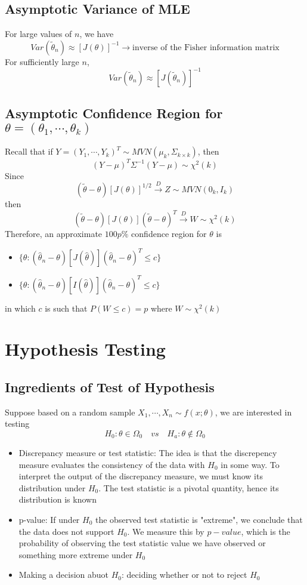 \documentclass[11pt]{article}
\begin{document}
\subsection{Asymptotic Variance of MLE}
For large values of $n$, we have 
\[Var(\tilde{\theta}_n)\approx[J(\theta)]^{-1}\rightarrow\text{inverse of the Fisher information matrix}\]
For sufficiently large $n$, 
\[Var(\tilde{\theta}_n)\approx[J(\tilde{\theta}_n)]^{-1}\]
\subsection{Asymptotic Confidence Region for $\theta=(\theta_1,\cdots,\theta_k)$}
Recall that if $Y=(Y_1,\cdots,Y_k)^T\sim MVN(\mu_k,\Sigma_{k\times k})$, then 
\[(Y-\mu)^T\Sigma^{-1}(Y-\mu)\sim\chi^2(k)\]
Since 
\[(\tilde{\theta}-\theta)\left[J(\theta)\right]^{1/2}\overset{D}{\rightarrow}Z\sim MVN(0_k,I_k)\]
then
\[(\tilde{\theta}-\theta)[J(\theta)](\tilde{\theta}-\theta)^T\overset{D}{\rightarrow}W\sim\chi^2(k)\]
Therefore, an approximate $100p\%$ confidence region for $\theta$ is 
\begin{itemize}
    \item $\{\theta: (\hat\theta_n-\theta)[J(\hat\theta)](\hat\theta_n-\theta)^T\leq c\}$
    \item $\{\theta: (\hat\theta_n-\theta)[I(\hat\theta)](\hat\theta_n-\theta)^T\leq c\}$
\end{itemize}
in which $c$ is such that $P(W\leq c)=p$ where $W\sim\chi^2(k)$

\section{Hypothesis Testing}
\subsection{Ingredients of Test of Hypothesis}
Suppose based on a random sample $X_1,\cdots,X_n\sim f(x;\theta)$, we are interested in testing 
\[H_0:\theta\in\Omega_0\quad vs\quad H_a:\theta\notin\Omega_0\]
\begin{itemize}
    \item Discrepancy measure or test statistic: The idea is that the discrepency measure evaluates the consistency of the data with $H_0$ in some way. 
    To interpret the output of the discrepancy measure, we must know its distribution under $H_0$. The test statistic is a pivotal quantity, hence its distribution 
    is known 
    \item p-value: If under $H_0$ the observed test statistic is "extreme", we conclude that the data does not support $H_0$. We 
    measure this by $p-value$, which is the probability of observing the test statistic value we have observed or something more extreme under $H_0$
    \item Making a decision abuot $H_0$: deciding whether or not to reject $H_0$
\end{itemize}
\end{document}
